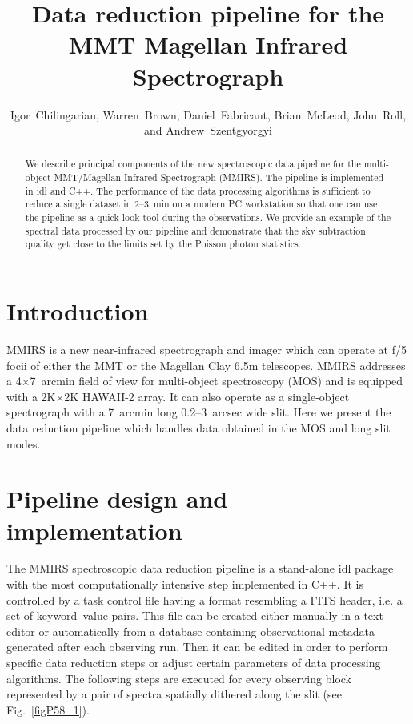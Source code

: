 
\resetcounters




\title{Data reduction pipeline for the MMT Magellan Infrared Spectrograph
}
\author{Igor~Chilingarian, 
Warren~Brown, Daniel~Fabricant, 
Brian~McLeod, John~Roll,
and Andrew~Szentgyorgyi
}


\begin{abstract} We describe principal components of the new spectroscopic
data pipeline for the multi-object MMT/Magellan Infrared Spectrograph
(MMIRS).  The pipeline is implemented in {\sc idl} and {\sc C++}.  The
performance of the data processing algorithms is sufficient to reduce a
single dataset in 2--3~min on a modern PC workstation so that one can use
the pipeline as a quick-look tool during the observations.  We provide an
example of the spectral data processed by our pipeline and demonstrate that
the sky subtraction quality get close to the limits set by the Poisson
photon statistics.
\end{abstract}

\section{Introduction} 

MMIRS \citep{McLeod+12} is a new near-infrared spectrograph and imager which
can operate at f/5 focii of either the MMT or the Magellan Clay 6.5m
telescopes.  MMIRS addresses a 4$\times$7~arcmin field of view for
multi-object spectroscopy (MOS) and is equipped with a 2K$\times$2K HAWAII-2
array.  It can also operate as a single-object spectrograph with a 7~arcmin
long 0.2--3~arcsec wide slit.  Here we present the data reduction pipeline
which handles data obtained in the MOS and long slit modes.

\section{Pipeline design and implementation}

The MMIRS spectroscopic data reduction pipeline is a stand-alone {\sc idl}
package with the most computationally intensive step implemented in {\sc
C++}.  It is controlled by a task control file having a format resembling a
FITS header, i.e.  a set of keyword--value pairs.  This file can be created
either manually in a text editor or automatically from a database containing
observational metadata generated after each observing run.  Then it can be
edited in order to perform specific data reduction steps or adjust certain
parameters of data processing algorithms.  The following steps are
executed for every observing block represented by a pair of spectra
spatially dithered along the slit (see Fig.~\ref{figP58_1}).

